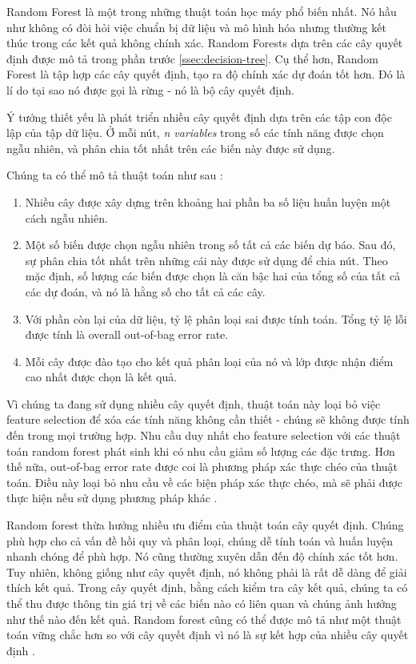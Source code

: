 Random Forest là một trong những thuật toán học máy phổ biến nhất. Nó hầu như không có đòi hỏi việc chuẩn bị dữ liệu và mô hình hóa nhưng thường kết thúc trong các kết quả không chính xác. Random Forests dựa trên các cây quyết định được mô tả trong phần trước \ref{ssec:decision-tree}. Cụ thể hơn, Random Forest là tập hợp các cây quyết định, tạo ra độ chính xác dự đoán tốt hơn. Đó là lí do tại sao nó được gọi là rừng - nó là bộ cây quyết định.

Ý tưởng thiết yếu là phát triển nhiều cây quyết định dựa trên các tập con độc lập của tập dữ liệu. Ở mỗi nút, \textit{n variables} trong số các tính năng được chọn ngẫu nhiên, và phân chia tốt nhất trên các biến này được sử dụng.

Chúng ta có thể mô tả thuật toán như sau \cite{biau2012analysis}:

\begin{enumerate}
\item Nhiều cây được xây dựng trên khoảng hai phần ba số liệu huấn luyện một cách ngẫu nhiên.
\item Một số biến được chọn ngẫu nhiên trong số tất cả các biến dự báo. Sau đó, sự phân chia tốt nhất trên những cái này được sử dụng để chia nút. Theo mặc định, số lượng các biến được chọn là căn bậc hai của tổng số của tất cả các dự đoán, và nó là hằng số cho tất cả các cây.
\item Với phần còn lại của dữ liệu, tỷ lệ phân loại sai được tính toán. Tổng tỷ lệ lỗi được tính là overall out-of-bag error rate.
\item Mỗi cây được đào tạo cho kết quả phân loại của nó và lớp được nhận điểm cao nhất được chọn là kết quả.
\end{enumerate}

Vì chúng ta đang sử dụng nhiều cây quyết định, thuật toán này loại bỏ việc feature selection để xóa các tính năng không cần thiết - chúng sẽ không được tính đến trong mọi trường hợp. Nhu cầu duy nhất cho feature selection với các thuật toán random forest phát sinh khi có nhu cầu giảm số lượng các đặc trưng. Hơn thế nữa, out-of-bag error rate được coi là phương pháp xác thực chéo của thuật toán. Điều này loại bỏ nhu cầu về các biện pháp xác thực chéo, mà sẽ phải được thực hiện nếu sử dụng phương pháp khác \cite{mitchell1997machine}.

Random forest thừa hưởng nhiều ưu điểm của thuật toán cây quyết định. 
Chúng phù hợp cho cả vấn đề hồi quy và phân loại, chúng dễ tính toán và huấn luyện nhanh chóng để phù hợp. 
Nó cũng thường xuyên dẫn đến độ chính xác tốt hơn.
Tuy nhiên, không giống như cây quyết định, nó không phải là rất dễ dàng để giải thích kết quả.
Trong cây quyết định, bằng cách kiểm tra cây kết quả, chúng ta có thể thu được thông tin giá trị về các biến nào có liên quan và chúng ảnh hưởng như thế nào đến kết quả.
Random forest cũng có thể được mô tả như một thuật toán vững chắc hơn so với cây quyết định vì nó là sự kết hợp của nhiều cây quyết định \cite{louppe2014understanding}.

